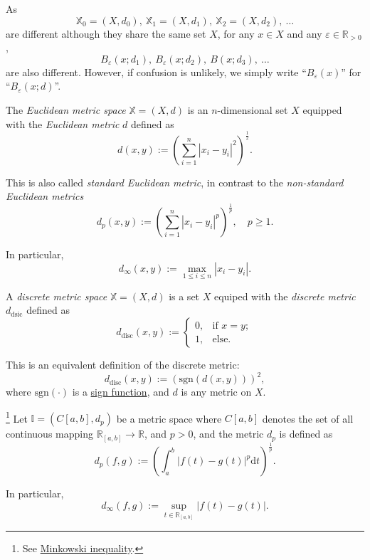 \begin{note}
	As
	$$
	\mathbb X_0 = (X, d_0), \ \mathbb X_1 = (X, d_1), \ \mathbb X_2 = (X, d_2), \ \ldots
	$$
	are different although they share the same set $X$, for any $x \in X$ and any $\varepsilon \in \mathbb R_{> 0}$,
	$$
	B_\varepsilon(x; d_1),\ B_\varepsilon (x; d_2), \ B(x; d_3), \ \ldots
	$$
	are also different. However, if confusion is unlikely, we simply write ``$B_\varepsilon(x)$'' for ``$B_\varepsilon(x; d)$''.
\end{note}


\begin{example}
	The \textit{Euclidean metric space} $\mathbb X = (X, d)$ is an $n$-dimensional set $X$ equipped with the \textit{Euclidean metric} $d$ defined as
	$$
	d(x,y) := \left( \sum_{i = 1}^n |x_i - y_i|^2 \right)^\frac{1}{2}.
	$$
	
	This is also called \textit{standard Euclidean metric}, in contrast to the \textit{non-standard Euclidean metrics}
	$$
	d_p(x,y) := \left( \sum_{i = 1}^n |x_i - y_i|^p \right)^\frac{1}{p}, \quad p \ge 1.
	$$
	
	In particular,
	$$
	d_\infty (x,y) := \max_{1 \le i \le n} |x_i - y_i|.
	$$
\end{example}


\begin{example}
	A \textit{discrete metric space} $\mathbb X = (X, d)$ is a set $X$ equiped with the \textit{discrete metric} $d_\mathrm{dsic}$ defined as
	$$
	d_\mathrm{disc}(x,y) :=
	\begin{cases}
		0, & \text{if $x = y$}; \\
		1, & \text{else}.
	\end{cases}
	$$
	
	This is an equivalent definition of the discrete metric:
	$$
	d_\mathrm{disc}(x, y) := (\mathrm{sgn}(d(x,y)))^2,
	$$
	where $\mathrm{sgn}(\cdot)$ is a \href{https://en.wikipedia.org/wiki/Sign_function}{sign function}, and $d$ is any metric on $X$.
\end{example}


\begin{example}
	\footnote{
		See \href{https://en.wikipedia.org/wiki/Minkowski_inequality}{Minkowski inequality}.
	}
	Let $\mathbb I = (C{[a,b]}, d_p)$ be a metric space where $C{[a,b]}$ denotes the set of all continuous mapping $\mathbb R_{[a,b]} \to \mathbb R$, and $p > 0$, and the metric $d_p$ is defined as
	$$
	d_p(f, g) := \left( \int_{a}^{b} |f(t) - g(t)|^p \mathrm{d} t \right)^\frac{1}{p}.
	$$
	
	In particular,
	$$
	d_\infty (f,g) := \sup_{t \in \mathbb R_{[a,b]}} |f(t) - g(t)|.
	$$
\end{example}


